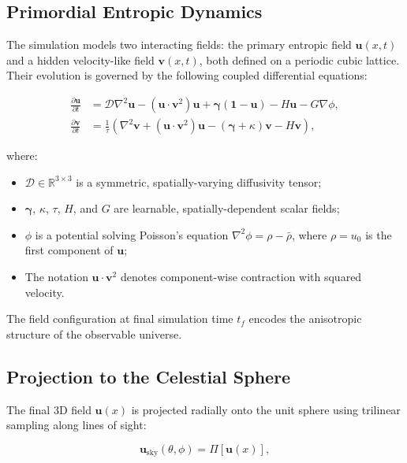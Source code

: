 \documentclass[12pt, a4paper]{article}
\begin{document}
\subsection{Primordial Entropic Dynamics}

The simulation models two interacting fields: the primary entropic field \( \mathbf{u}(x, t) \) and a hidden velocity-like field \( \mathbf{v}(x, t) \), both defined on a periodic cubic lattice. Their evolution is governed by the following coupled differential equations:

\begin{align}
\frac{\partial \mathbf{u}}{\partial t} &= \mathcal{D} \nabla^2 \mathbf{u} - (\mathbf{u} \cdot \mathbf{v}^2)\mathbf{u} + \boldsymbol{\gamma}(\mathbf{1} - \mathbf{u}) - H \mathbf{u} - G \nabla \phi, \\
\frac{\partial \mathbf{v}}{\partial t} &= \frac{1}{\tau} \left( \nabla^2 \mathbf{v} + (\mathbf{u} \cdot \mathbf{v}^2)\mathbf{u} - (\boldsymbol{\gamma} + \kappa)\mathbf{v} - H \mathbf{v} \right),
\end{align}

where:
\begin{itemize}
    \item \( \mathcal{D} \in \mathbb{R}^{3 \times 3} \) is a symmetric, spatially-varying diffusivity tensor;
    \item \( \boldsymbol{\gamma} \), \( \kappa \), \( \tau \), \( H \), and \( G \) are learnable, spatially-dependent scalar fields;
    \item \( \phi \) is a potential solving Poisson's equation \( \nabla^2 \phi = \rho - \bar{\rho} \), where \( \rho = u_0 \) is the first component of \( \mathbf{u} \);
    \item The notation \( \mathbf{u} \cdot \mathbf{v}^2 \) denotes component-wise contraction with squared velocity.
\end{itemize}

The field configuration at final simulation time \( t_f \) encodes the anisotropic structure of the observable universe.

\subsection{Projection to the Celestial Sphere}

The final 3D field \( \mathbf{u}(x) \) is projected radially onto the unit sphere using trilinear sampling along lines of sight:

\[
\mathbf{u}_{\text{sky}}(\theta, \phi) = \Pi[\mathbf{u}(x)],
\]
\end{document}
